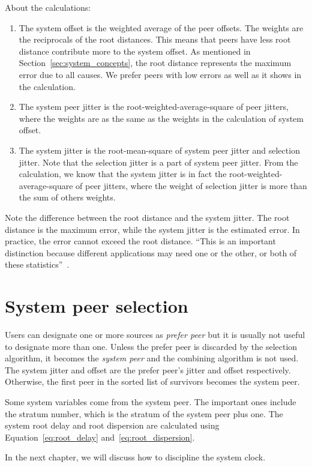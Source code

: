 About the calculations:
\begin{enumerate}
    \item The system offset is the weighted average of the peer offsets. The
        weights are the reciprocals of the root distances. This means that peers
        have less root distance contribute more to the system offset. As
        mentioned in Section~\ref{sec:system_concepts}, the root distance
        represents the maximum error due to all causes. We prefer peers with
        low errors as well as it shows in the calculation.
    \item The system peer jitter is the root-weighted-average-square of peer
        jitters, where the weights are as the same as the weights in the
        calculation of system offset.
    \item The system jitter is the root-mean-square of system peer jitter and
        selection jitter. Note that the selection jitter is a part of system
        peer jitter. From the calculation, we know that the system jitter is
        in fact the root-weighted-average-square of peer jitters, where the
        weight of selection jitter is more than the sum of others weights.
\end{enumerate}
Note the difference between the root distance and the system jitter. The root
distance is the maximum error, while the system jitter is the estimated error.
In practice, the error cannot exceed the root distance. ``This is an important
distinction because different applications may need one or the other, or both
of these statistics''~\cite{redbook}.

\section{System peer selection}%
\label{sec:system_peer_selection}
Users can designate one or more sources as \emph{prefer peer} but it is
usually not useful to designate more than one. Unless the prefer peer is
discarded by the selection algorithm, it becomes the \emph{system peer} and
the combining algorithm is not used. The system jitter and offset are the
prefer peer's jitter and offset respectively. Otherwise, the first peer in
the sorted list of survivors becomes the system peer. 

Some system variables come from the system peer. The important ones
include the stratum number, which is the stratum of the system peer plus one.
The system root delay and root dispersion are calculated using
Equation~\ref{eq:root_delay} and~\ref{eq:root_dispersion}.

In the next chapter, we will discuss how to discipline the system clock.
